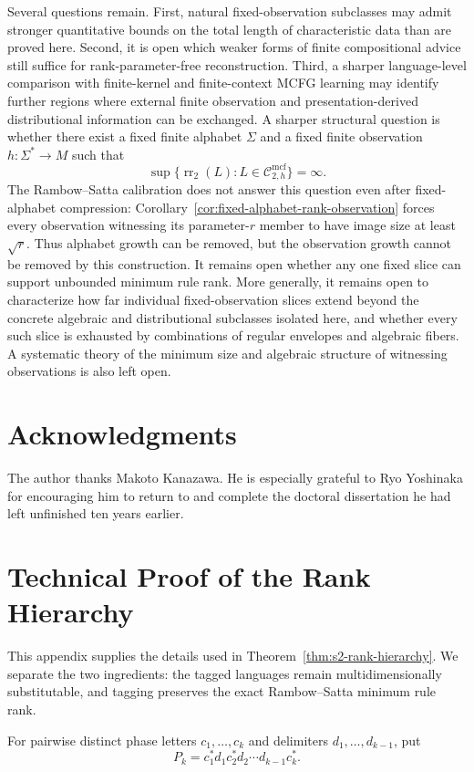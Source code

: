\documentclass[11pt,a4paper]{article}
\numberwithin{equation}{section}
\theoremstyle{plain}
\theoremstyle{definition}
\theoremstyle{remark}
\newcommand{\Cmcf}[2]{\mathcal{C}^{\mathrm{mcf}}_{#1,#2}}
\begin{document}
Several questions remain.  First, natural fixed-observation subclasses may
admit stronger quantitative bounds on the total length of characteristic data
than are proved here.  Second, it is open which weaker forms of finite
compositional advice still suffice for rank-parameter-free reconstruction.
Third, a sharper language-level comparison with finite-kernel and finite-context
MCFG learning may identify further regions where external finite observation
and presentation-derived distributional information can be exchanged.  A
sharper structural question is whether there exist a fixed finite alphabet
$\Sigma$ and a fixed finite observation $h:\Sigma^*\to M$ such that
\[
  \sup\{\operatorname{rr}_2(L):L\in\Cmcf{2}{h}\}=\infty.
\]
The Rambow--Satta calibration does not answer this question even after
fixed-alphabet compression: Corollary~\ref{cor:fixed-alphabet-rank-observation}
forces every observation witnessing its parameter-$r$ member to have image
size at least $\sqrt r$.  Thus alphabet growth can be removed, but the
observation growth cannot be removed by this construction.  It remains open
whether any one fixed slice can support unbounded minimum rule rank.  More
generally, it remains open to characterize how far
individual fixed-observation slices extend beyond the concrete algebraic and
distributional subclasses isolated here, and whether every such slice is
exhausted by combinations of regular envelopes and algebraic fibers.  A
systematic theory of the minimum size and algebraic structure of witnessing
observations is also left open.

\section*{Acknowledgments}
The author thanks Makoto Kanazawa.  He is especially grateful to Ryo Yoshinaka
for encouraging him to return to and complete the doctoral dissertation he had
left unfinished ten years earlier.

\appendix
\section{Technical Proof of the Rank Hierarchy}
\label{app:rank-hierarchy}

This appendix supplies the details used in
Theorem~\ref{thm:s2-rank-hierarchy}.  We separate the two ingredients: the
tagged languages remain multidimensionally substitutable, and tagging preserves
the exact Rambow--Satta minimum rule rank.

For pairwise distinct phase letters $c_1,\ldots,c_k$ and delimiters
$d_1,\ldots,d_{k-1}$, put
\[
  P_k=c_1^*d_1c_2^*d_2\cdots d_{k-1}c_k^*.
\]
\end{document}
